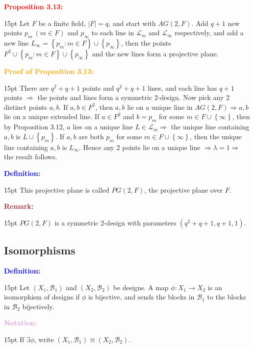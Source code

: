 \documentclass[12pt]{article}
\newcommand{\noparskip}{\vspace{-\parskip}}
\newenvironment{dent}
	{\begin{adjustwidth}{15pt}{}\noparskip}
	{\end{adjustwidth}}
\newenvironment{result}[1]
	{\textcolor{Red}{\textbf{#1:}}\begin{dent}}
	{\end{dent}}
\newenvironment{proof}[1]
	{\textcolor{Orange}{\textbf{Proof of #1:}}\begin{dent}}
	{\end{dent}}
\newenvironment{definition}
	{\textcolor{Blue}{\textbf{Definition:}}\begin{dent}}
	{\end{dent}}
\newenvironment{notation}
	{\textcolor{Plum}{\textbf{Notation:}}\begin{dent}}
	{\end{dent}}
\newenvironment{remark}
	{\textcolor{Brown}{\textbf{Remark:}}\begin{dent}}
	{\end{dent}}
\renewcommand{\implies}{\Rightarrow}
\newcommand{\set}[1]{\left\{ #1 \right\}}
\newcommand{\sizeof}[1]{\left| #1 \right|}
\newcommand{\cB}{\mathcal{B}}
\newcommand{\cL}{\mathcal{L}}
\begin{document}
\begin{result}{Proposition 3.13}
Let $F$ be a finite field, $\sizeof{F} = q$, and start with $AG(2, F)$. Add $q + 1$ new points $p_m\ (m \in F)$ and $p_\infty$ to each line in $\cL_m$ and $\cL_\infty$ respectively, and add a new line $L_\infty = \set{p_m : m \in F} \cup \set{p_\infty}$, then the points $F^2 \cup \set{p_m : m \in F} \cup \set{p_\infty}$ and the new lines form a projective plane.
\end{result}

\begin{proof}{Proposition 3.13}
There are $q^2 + q + 1$ points and $q^2 + q + 1$ lines, and each line has $q + 1$ points $\implies$ the points and lines form a symmetric 2-design. Now pick any 2 distinct points $a, b$. If $a, b \in F^2$, then $a, b$ lie on a unique line in $AG(2, F) \implies a, b$ lie on a unique extended line. If $a \in F^2$ and $b = p_m$ for some $m \in F \cup \set{\infty}$, then by Proposition 3.12, $a$ lies on a unique line $L \in \cL_m \implies$ the unique line containing $a, b$ is $L \cup \set{p_m}$. If $a, b$ are both $p_m$ for some $m \in F \cup \set{\infty}$, then the unique line containing $a, b$ is $L_\infty$. Hence any 2 points lie on a unique line $\implies \lambda = 1 \implies$ the result follows.
\end{proof}

\begin{definition}
This projective plane is called $PG(2, F)$, the projective plane over $F$.
\end{definition}

\begin{remark}
$PG(2, F)$ is a symmetric 2-design with parameters $(q^2 + q + 1, q + 1, 1)$.
\end{remark}

\subsection{Isomorphisms}

\begin{definition}
Let $(X_1, \cB_1)$ and $(X_2, \cB_2)$ be designs. A map $\phi: X_1 \rightarrow X_2$ is an isomorphism of designs if $\phi$ is bijective, and sends the blocks in $\cB_1$ to the blocks in $\cB_2$ bijectively.
\end{definition}

\begin{notation}
If $\exists \phi$, write $(X_1, \cB_1) \cong (X_2, \cB_2)$.
\end{notation}
\end{document}
